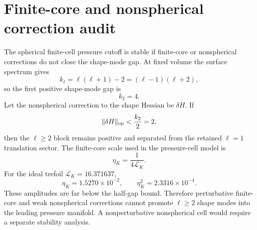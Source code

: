 \section{Finite-core and nonspherical correction audit}
\label{app:finite-core-shape-corrections}

The spherical finite-cell pressure cutoff is stable if finite-core or
nonspherical corrections do not close the shape-mode gap.  At fixed volume the
surface spectrum gives
\[
  k_\ell=\ell(\ell+1)-2=(\ell-1)(\ell+2),
\]
so the first positive shape-mode gap is
\[
  k_2=4.
\]
Let the nonspherical correction to the shape Hessian be \(\delta H\).  If
\[
  \|\delta H\|_{\rm op}<\frac{k_2}{2}=2,
\]
then the \(\ell\ge2\) block remains positive and separated from the retained
\(\ell=1\) translation sector.  The finite-core scale used in the pressure-cell
model is
\[
  \eta_K=\frac{1}{4\mathcal L_K}.
\]
For the ideal trefoil \(\mathcal L_K=16.371637\),
\[
  \eta_K=1.5270\times10^{-2},
  \qquad
  \eta_K^2=2.3316\times10^{-4}.
\]
These amplitudes are far below the half-gap bound.  Therefore perturbative
finite-core and weak nonspherical corrections cannot promote \(\ell\ge2\)
shape modes into the leading pressure manifold.  A nonperturbative nonspherical
cell would require a separate stability analysis.
